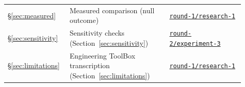 \documentclass[11pt,letterpaper]{article}
\begin{document}
\begin{longtable}{p{0.22\linewidth} p{0.40\linewidth} p{0.30\linewidth}}
  \S\ref{sec:measured} & Measured comparison (null outcome) & \href{https://github.com/ai-inventor-papers/ai-invention-fde7b3-simple-barometric-model-vs-boiling-point/tree/main/round-1/research-1}{\texttt{round-1/research-1}} \\
  \S\ref{sec:sensitivity} & Sensitivity checks (Section~\ref{sec:sensitivity}) & \href{https://github.com/ai-inventor-papers/ai-invention-fde7b3-simple-barometric-model-vs-boiling-point/tree/main/round-2/experiment-3}{\texttt{round-2/experiment-3}} \\
  \S\ref{sec:limitations} & Engineering ToolBox transcription (Section~\ref{sec:limitations}) & \href{https://github.com/ai-inventor-papers/ai-invention-fde7b3-simple-barometric-model-vs-boiling-point/tree/main/round-1/research-1}{\texttt{round-1/research-1}} \\
  \bottomrule
\end{longtable}
\end{document}
